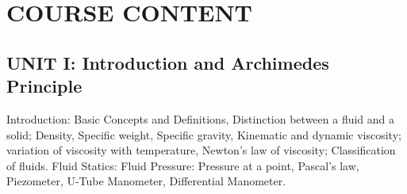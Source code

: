 \documentclass[12pt, a4paper]{article}
\begin{document}
                                                                                                                                                                                                                                                                                                                                                                                                            \newpage

                                                                                                                                                                                                                                                                                                                                                                                                            \section*{\centering \color{headerblue} COURSE CONTENT}

                                                                                                                                                                                                                                                                                                                                                                                                            \subsection*{UNIT I: Introduction and Archimedes Principle}
                                                                                                                                                                                                                                                                                                                                                                                                            \noindent Introduction: Basic Concepts and Definitions, Distinction between a fluid and a solid; Density, Specific weight, Specific gravity, Kinematic and dynamic viscosity; variation of viscosity with temperature, Newton’s law of viscosity; Classification of fluids. 
                                                                                                                                                                                                                                                                                                                                                                                                            \noindent Fluid Statics: Fluid Pressure: Pressure at a point, Pascal’s law, Piezometer, U-Tube Manometer, Differential Manometer.
\end{document}
